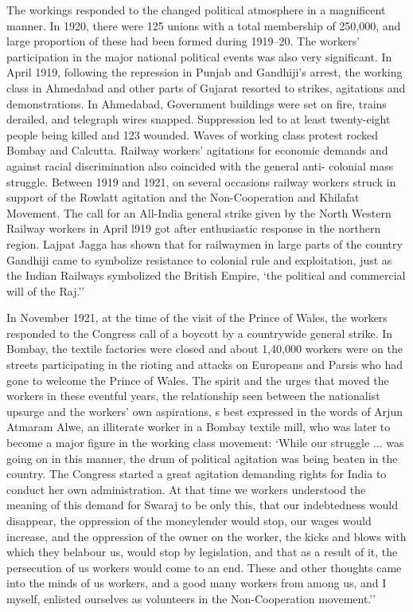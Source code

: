 The workings responded to the changed political atmosphere in a magnificent manner. In 1920, there were 125 unions with a total membership of 250,000, and large proportion of these had been formed during 1919--20. The workers' participation in the major national political events was also very significant. In April 1919, following the repression in Punjab and Gandhiji's arrest, the working class in Ahmedabad and other parts of Gujarat resorted to strikes, agitations and demonstrations. In Ahmedabad, Government buildings were set on fire, trains derailed, and telegraph wires snapped. Suppression led to at least twenty-eight people being killed and 123 wounded. Waves of working class protest rocked Bombay and Calcutta. Railway workers' agitations for economic demands and against racial discrimination also coincided with the general anti- colonial mass struggle. Between 1919 and 1921, on several occasions railway workers struck in support of the Rowlatt agitation and the Non-Cooperation and Khilafat Movement. The call for an All-India general strike given by the North Western Railway workers in April l919 got after enthusiastic response in the northern region. Lajpat Jagga has shown that for railwaymen in large parts of the country Gandhiji came to symbolize resistance to colonial rule and exploitation, just as the Indian Railways symbolized the British Empire, `the political and commercial will of the Raj.''

In November 1921, at the time of the visit of the Prince of Wales, the workers responded to the Congress call of a boycott by a countrywide general strike. In Bombay, the textile factories were closed and about 1,40,000 workers were on the streets participating in the rioting and attacks on Europeans and Parsis who had gone to welcome the Prince of Wales. The spirit and the urges that moved the workers in these eventful years, the relationship seen between the nationalist upsurge and the workers' own aspirations, s best expressed in the words of Arjun Atmaram Alwe, an illiterate worker in a Bombay textile mill, who was later to become a major figure in the working class movement: `While our struggle ... was going on in this manner, the drum of political agitation was being beaten in the country. The Congress started a great agitation demanding rights for India to conduct her own administration. At that time we workers understood the meaning of this demand for Swaraj to be only this, that our indebtedness would disappear, the oppression of the moneylender would stop, our wages would increase, and the oppression of the owner on the worker, the kicks and blows with which they belabour us, would stop by legislation, and that as a result of it, the persecution of us workers would come to an end. These and other thoughts came into the minds of us workers, and a good many workers from among us, and I myself, enlisted ourselves as volunteers in the Non-Cooperation movement.''

